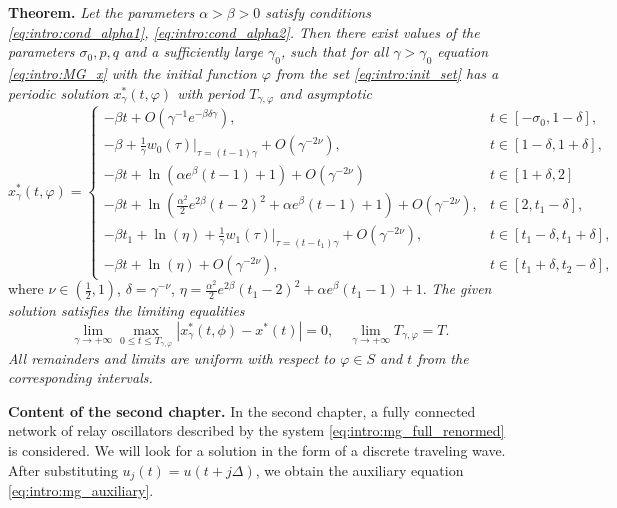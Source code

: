 \bigskip

\textbf{Theorem.} \textit{Let the parameters $\alpha > \beta > 0$ satisfy conditions \eqref{eq:intro:cond_alpha1}, \eqref{eq:intro:cond_alpha2}. Then there exist values of the parameters $\sigma_0, p, q$ and a sufficiently large $\gamma_0$, such that for all $\gamma > \gamma_0$ equation \eqref{eq:intro:MG_x} with the initial function $\varphi$ from the set \eqref{eq:intro:init_set} has a periodic solution $x^*_\gamma(t, \varphi)$ with period $T_{\gamma, \varphi}$ and asymptotic}
\footnotesize
\begin{equation}
	\label{eq:intro:sol_x*gamma}
	x^*_\gamma(t, \varphi)= 
	\begin{cases}
		- \beta t + O(\gamma^{-1} e^{-\beta \delta \gamma}), & t\in[-\sigma_0, 1 - \delta],\\
		-\beta + \frac{1}{\gamma} w_0(\tau)|_{\tau=(t - 1)\gamma} + O(\gamma^{-2\nu}), & t \in [1 - \delta,1 + \delta],\\
		- \beta t + \ln(\alpha e^{\beta}(t - 1) + 1) + O(\gamma^{-2\nu}) & t\in[1 + \delta, 2]\\
		- \beta t + \ln(\frac{\alpha^2}{2}e^{2 \beta}(t - 2)^2 + \alpha e^{\beta}(t - 1) + 1) + O(\gamma^{-2\nu}), & t \in [2, t_1 - \delta],\\
		- \beta t_1 + \ln(\eta)+\frac{1}{\gamma} w_1(\tau)|_{\tau=(t - t_1)\gamma} + O(\gamma^{-2\nu}), & t\in[t_1 - \delta, t_1  +\delta],\\
		- \beta t + \ln(\eta) + O(\gamma^{-2\nu}), & t \in [t_1 + \delta, t_2 - \delta],
	\end{cases}
\end{equation}
\normalsize
where $\nu \in (\frac{1}{2}, 1)$, $\delta = \gamma^{-\nu}$, $\eta=\frac{\alpha^2}{2}e^{2\beta}(t_1 - 2)^2 + \alpha e^{\beta}(t_1 - 1) + 1$.
%
\textit{The given solution satisfies the limiting equalities}
%
\begin{equation}
	\label{eq:intro:lim_x*}
	\lim_{\gamma\to+\infty}\max_{0\leqslant t\leqslant T_{\gamma, \varphi}}|x_{\gamma}^*(t, \phi)-x^*(t)|=0,\quad \lim_{\gamma\to+\infty}T_{\gamma, \varphi} = T.
\end{equation}
\textit{All remainders and limits are uniform with respect to $\varphi \in S$ and $t$ from the corresponding intervals.}

\textbf{Content of the second chapter.} In the second chapter, a fully connected network of relay oscillators described by the system \eqref{eq:intro:mg_full_renormed} is considered. We will look for a solution in the form of a discrete traveling wave. After substituting $u_j(t) = u(t + j\Delta)$, we obtain the auxiliary equation \eqref{eq:intro:mg_auxiliary}.

